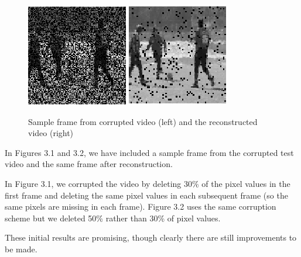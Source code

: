 \begin{figure}
\label{fig:soccer}
\center
\includegraphics{Images/corr2.png}
\includegraphics{Images/rec2.png}
\caption{Sample frame from corrupted video (left) and the reconstructed video (right)}
\end{figure}

In Figures 3.1 and 3.2, we have included a sample frame from the corrupted test video and the same frame after reconstruction.

In Figure 3.1, we corrupted the video by deleting 30\% of the pixel values in the first frame and deleting the same pixel values in each subsequent frame (so the same pixels are missing in each frame).
Figure 3.2 uses the same corruption scheme but we deleted 50\% rather than 30\% of pixel values.

These initial results are promising, though clearly there are still improvements to be made.

